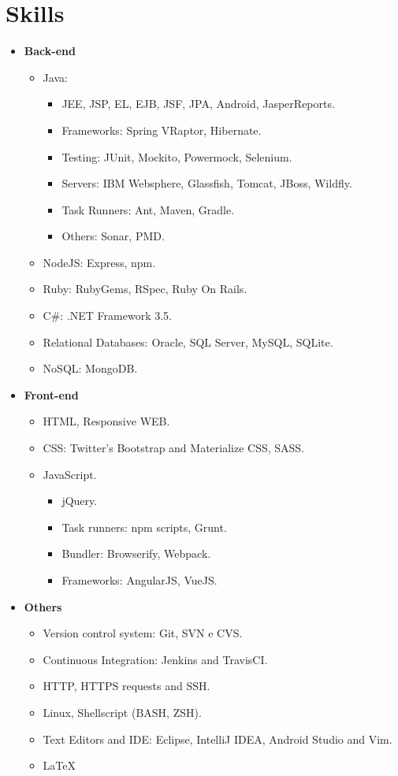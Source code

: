 \documentclass[12pt,a4paper]{moderncv}
\begin{document}
\section{Skills}
\begin{itemize}
\item \textbf{Back-end}
\begin{itemize}
    \item Java:
    \begin{itemize}
        \item JEE, JSP, EL, EJB, JSF, JPA, Android, JasperReports.
        \item Frameworks: Spring VRaptor, Hibernate.
        \item Testing: JUnit, Mockito, Powermock, Selenium.
        \item Servers: IBM Websphere, Glassfish, Tomcat, JBoss, Wildfly.
        \item Task Runners: Ant, Maven, Gradle.
        \item Others: Sonar, PMD.
    \end{itemize}
    \item NodeJS: Express, npm.
    \item Ruby: RubyGems, RSpec, Ruby On Rails.
    \item C\#: .NET Framework 3.5.
    \item Relational Databases: Oracle, SQL Server, MySQL, SQLite.
    \item NoSQL: MongoDB. 
\end{itemize}
\item \textbf{Front-end}
\begin{itemize}
    \item HTML, Responsive WEB.
    \item CSS: Twitter's Bootstrap and Materialize CSS, SASS.
    \item JavaScript.
    \begin{itemize}
        \item jQuery.
        \item Task runners: npm scripts, Grunt.
        \item Bundler: Browserify, Webpack.
        \item Frameworks: AngularJS, VueJS.
    \end{itemize}
\end{itemize}
\item \textbf{Others}
\begin{itemize}
  \item Version control system: Git, SVN e CVS.
  \item Continuous Integration: Jenkins and TravisCI.
  \item HTTP, HTTPS requests and SSH.
  \item Linux, Shellscript (BASH, ZSH).
  \item Text Editors and IDE: Eclipse, IntelliJ IDEA, Android Studio and Vim.
  \item \LaTeX\
\end{itemize}
\end{itemize}
\end{document}

